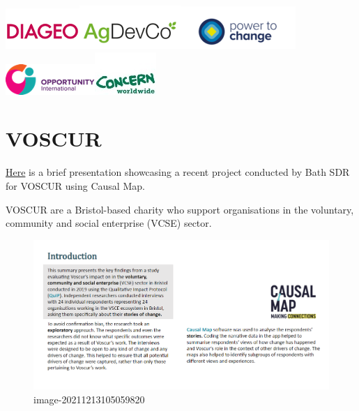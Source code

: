\documentclass[
]{book}
\begin{document}
\href{https://causalmap.app/algo/}{\includegraphics{_assets/algo.png}}\href{https://causalmap.app/2logo/}{\includegraphics{_assets/2logo.png}}\href{https://causalmap.app/3logo/}{\includegraphics{_assets/3logo.png}} \href{https://causalmap.app/logo7-2/}{\includegraphics{_assets/logo7-1.png}}\href{https://causalmap.app/4logo/}{\includegraphics{_assets/4logo.jpg}}

\hypertarget{voscur}{%
\section{VOSCUR}\label{voscur}}

\href{https://drive.google.com/file/d/1DHXpmgfvMRw11Ejqv8l-LXrpzJTsVZFY/view}{Here} is a brief presentation showcasing a recent project conducted by Bath SDR for VOSCUR using Causal Map.

VOSCUR are a Bristol-based charity who support organisations in the voluntary, community and social enterprise (VCSE) sector.

\begin{figure}
\centering
\includegraphics[width=6.77083in,height=\textheight]{_assets/image-20211213105059820.png}
\caption{image-20211213105059820}
\end{figure}
\end{document}
